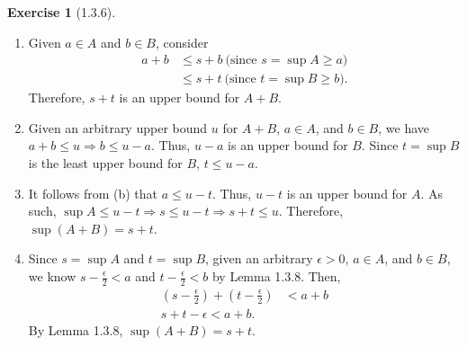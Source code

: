 \documentclass{amsart}
\theoremstyle{definition}
\newtheorem{exercise}{Exercise}
\begin{document}
\begin{exercise}[1.3.6]
  \begin{enumerate}[label={(\alph*)}]
    \item Given $a \in A$ and $b \in B$, consider
      \begin{align*}
        a + b &\le s + b\ \text{(since $s = \sup{A} \ge a$)} \\
        &\le s + t\ \text{(since $t = \sup{B} \ge b$)}.
      \end{align*}
      Therefore, $s + t$ is an upper bound for $A + B$.
    \item Given an arbitrary upper bound $u$ for  $A + B$, $a \in A$, and $b \in
      B$, we have $a + b \le u \Rightarrow b \le u - a$. Thus, $u - a$ is an
      upper bound for $B$. Since $t = \sup{B}$ is the least upper bound for $B$,
      $t \le u - a$.
    \item It follows from (b) that $a \le u - t$. Thus, $u - t$ is an upper
      bound for $A$. As such, $\sup{A} \le u - t \Rightarrow s \le u - t
      \Rightarrow s + t \le u$. Therefore, $\sup(A + B) = s + t$.
    \item Since $s = \sup{A}$ and $t = \sup{B}$, given an arbitrary $\epsilon >
      0$, $a \in A$, and $b \in B$, we know $s - \frac{\epsilon}{2} < a$ and $t
      - \frac{\epsilon}{2} < b$ by Lemma 1.3.8. Then,
      \begin{align*}
        (s - \frac{\epsilon}{2}) + (t - \frac{\epsilon}{2}) &< a + b \\
        s + t - \epsilon < a + b.
      \end{align*}
      By Lemma 1.3.8, $\sup(A + B) = s + t$.
  \end{enumerate}
\end{exercise}
\end{document}

